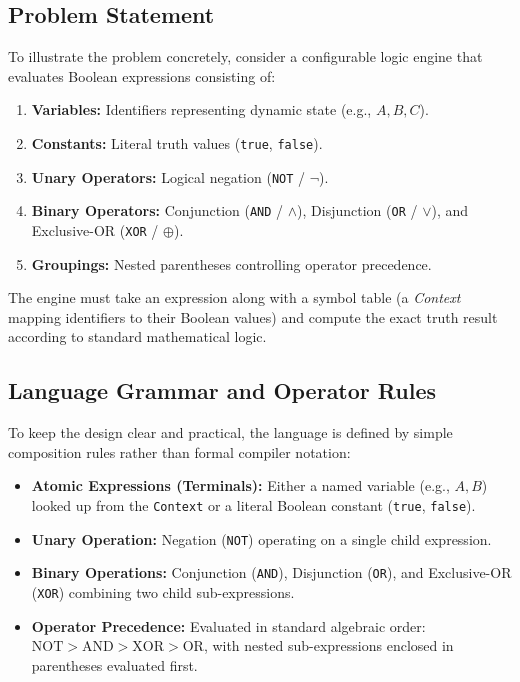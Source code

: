 \documentclass[12pt,a4paper]{article}
\begin{document}
\subsection{Problem Statement}
To illustrate the problem concretely, consider a configurable logic engine that evaluates Boolean expressions consisting of:
\begin{enumerate}
    \item \textbf{Variables:} Identifiers representing dynamic state (e.g., $A, B, C$).
    \item \textbf{Constants:} Literal truth values (\texttt{true}, \texttt{false}).
    \item \textbf{Unary Operators:} Logical negation (\texttt{NOT} / $\neg$).
    \item \textbf{Binary Operators:} Conjunction (\texttt{AND} / $\land$), Disjunction (\texttt{OR} / $\lor$), and Exclusive-OR (\texttt{XOR} / $\oplus$).
    \item \textbf{Groupings:} Nested parentheses controlling operator precedence.
\end{enumerate}

The engine must take an expression along with a symbol table (a \textit{Context} mapping identifiers to their Boolean values) and compute the exact truth result according to standard mathematical logic.

\subsection{Language Grammar and Operator Rules}
To keep the design clear and practical, the language is defined by simple composition rules rather than formal compiler notation:
\begin{itemize}
    \item \textbf{Atomic Expressions (Terminals):} Either a named variable (e.g., $A, B$) looked up from the \texttt{Context} or a literal Boolean constant (\texttt{true}, \texttt{false}).
    \item \textbf{Unary Operation:} Negation (\texttt{NOT}) operating on a single child expression.
    \item \textbf{Binary Operations:} Conjunction (\texttt{AND}), Disjunction (\texttt{OR}), and Exclusive-OR (\texttt{XOR}) combining two child sub-expressions.
    \item \textbf{Operator Precedence:} Evaluated in standard algebraic order: $\text{NOT} > \text{AND} > \text{XOR} > \text{OR}$, with nested sub-expressions enclosed in parentheses evaluated first.
\end{itemize}
\end{document}
